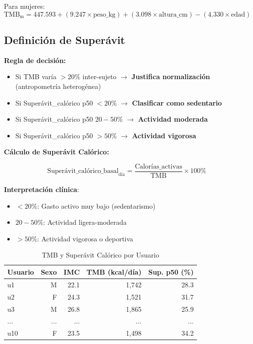 \documentclass[12pt,letterpaper,twoside]{report}
\begin{document}
\begin{calculobox}
\begin{estadisticobox}
Para mujeres:
\begin{equation}
\text{TMB}_{\text{m}} = 447.593 + (9.247 \times \text{peso\_kg}) + (3.098 \times \text{altura\_cm}) - (4.330 \times \text{edad})
\end{equation}
\end{estadisticobox}

\subsection{Definición de Superávit}

\begin{reglabox}
\textbf{Regla de decisión:}

\begin{itemize}[noitemsep]
    \item Si TMB varía $>20\%$ inter-sujeto $\to$ \textbf{Justifica normalización} (antropometría heterogénea)
    \item Si Superávit\_calórico p50 $<20\%$ $\to$ \textbf{Clasificar como sedentario}
    \item Si Superávit\_calórico p50 $20-50\%$ $\to$ \textbf{Actividad moderada}
    \item Si Superávit\_calórico p50 $>50\%$ $\to$ \textbf{Actividad vigorosa}
\end{itemize}
\end{reglabox}

\begin{calculobox}
\textbf{Cálculo de Superávit Calórico:}

\begin{equation}
\text{Superávit\_calórico\_basal}_{\text{día}} = \frac{\text{Calorías\_activas}}{\text{TMB}} \times 100\%
\end{equation}

\textbf{Interpretación clínica}:
\begin{itemize}[noitemsep]
    \item $<20\%$: Gasto activo muy bajo (sedentarismo)
    \item $20-50\%$: Actividad ligera-moderada
    \item $>50\%$: Actividad vigorosa o deportiva
\end{itemize}
\end{calculobox}

\begin{table}[H]
\centering
\caption{TMB y Superávit Calórico por Usuario}
\label{tab:tmb_surplus}
\begin{tabular}{@{}lrrrr@{}}
\toprule
\textbf{Usuario} & \textbf{Sexo} & \textbf{IMC} & \textbf{TMB (kcal/día)} & \textbf{Sup. p50 (\%)} \\
\midrule
u1  & M & 22.1 & 1,742 & 28.3 \\
u2  & F & 24.3 & 1,521 & 31.7 \\
u3  & M & 26.8 & 1,865 & 25.9 \\
... & ...& ... & ... & ... \\
u10 & F & 23.5 & 1,498 & 34.2 \\
\bottomrule
\end{tabular}
\end{table}


\end{calculobox}
\end{document}
